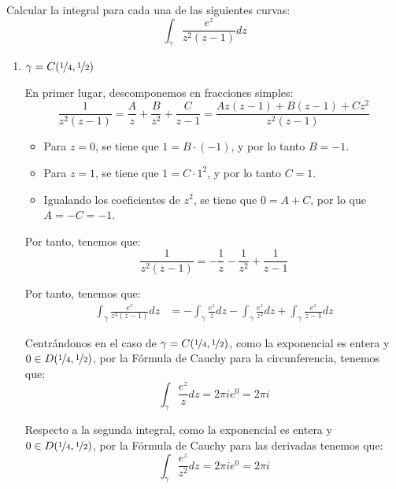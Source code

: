 \begin{ejercicio}
    Calcular la integral para cada una de las siguientes curvas:
    \begin{equation*}
        \int_{\gamma} \frac{e^z}{z^2(z-1)}dz
    \end{equation*}
    \begin{enumerate}
        \item $\gamma = C(\nicefrac{1}{4},\nicefrac{1}{2})$
        
        En primer lugar, descomponemos en fracciones simples:
        \begin{equation*}
            \frac{1}{z^2(z-1)} = \frac{A}{z} + \frac{B}{z^2} + \frac{C}{z-1} = \frac{Az(z-1)+B(z-1)+Cz^2}{z^2(z-1)}
        \end{equation*}
        \begin{itemize}
            \item Para $z=0$, se tiene que $1=B\cdot (-1)$, y por lo tanto $B=-1$.
            \item Para $z=1$, se tiene que $1=C\cdot 1^2$, y por lo tanto $C=1$.
            \item Igualando los coeficientes de $z^2$, se tiene que $0=A+C$, por lo que $A=-C=-1$.
        \end{itemize}

        Por tanto, tenemos que:
        \begin{equation*}
            \frac{1}{z^2(z-1)} = -\frac{1}{z} - \frac{1}{z^2} + \frac{1}{z-1}
        \end{equation*}

        Por tanto, tenemos que:
        \begin{align*}
            \int_{\gamma} \frac{e^z}{z^2(z-1)}dz &= -\int_{\gamma} \frac{e^z}{z}dz - \int_{\gamma} \frac{e^z}{z^2}dz + \int_{\gamma} \frac{e^z}{z-1}dz
        \end{align*}

        Centrándonos en el caso de $\gamma = C(\nicefrac{1}{4},\nicefrac{1}{2})$, como la exponencial es entera y $0\in D(\nicefrac{1}{4},\nicefrac{1}{2})$, por la Fórmula de Cauchy para la circunferencia, tenemos que:
        \begin{equation*}
            \int_{\gamma} \frac{e^z}{z}dz = 2\pi i e^0 = 2\pi i
        \end{equation*}

        Respecto a la segunda integral, como la exponencial es entera y $0\in D(\nicefrac{1}{4},\nicefrac{1}{2})$, por la Fórmula de Cauchy para las derivadas tenemos que:
        \begin{equation*}
            \int_{\gamma} \frac{e^z}{z^2}dz = 2\pi i e^0 = 2\pi i
        \end{equation*}


\end{enumerate}
\end{ejercicio}
